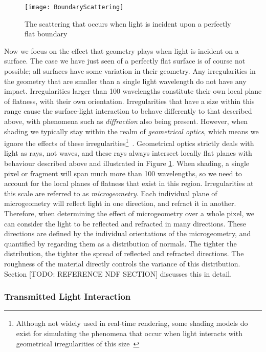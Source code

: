 \begin{figure}[h]
	\centering
	\texttt{[image: BoundaryScattering]}
	\caption{The scattering that occurs when light is incident upon a perfectly flat boundary}
	\label{fig:BoundaryScattering}
\end{figure}

Now we focus on the effect that geometry plays when light is incident on a surface. The case we have just seen of a perfectly flat surface is of course not possible; all surfaces have some variation in their geometry. Any irregularities in the geometry that are smaller than a single light wavelength do not have any impact. Irregularities larger than 100 wavelengths constitute their own local plane of flatness, with their own orientation. Irregularities that have a size within this range cause the surface-light interaction to behave differently to that described above, with phenomena such as \textit{diffraction} also being present. However, when shading we typically stay within the realm of \textit{geometrical optics}, which means we ignore the effects of these irregularities\footnote{Although not widely used in real-time rendering, some shading models do exist for simulating the phenomena that occur when light interacts with geometrical irregularities of this size~\cite{ReflectionAndDiffractionModel}}~\cite{DiffuseSpecularAtSurfaces}. Geometrical optics strictly deals with light as rays, not waves, and these rays always intersect locally flat planes with behaviour described above and illustrated in Figure \ref{fig:BoundaryScattering}. When shading, a single pixel or fragment will span much more than 100 wavelengths, so we need to account for the local planes of flatness that exist in this region. Irregularities at this scale are referred to as \textit{microgeometry}. Each individual plane of microgeometry will reflect light in one direction, and refract it in another. Therefore, when determining the effect of microgeometry over a whole pixel, we can consider the light to be reflected and refracted in many directions. These directions are defined by the individual orientations of the microgeometry, and quantified by regarding them as a distribution of normals. The tighter the distribution, the tighter the spread of reflected and refracted directions. The roughness of the material directly controls the variance of this distribution. Section [TODO: REFERENCE NDF SECTION] discusses this in detail.

\subsubsection{Transmitted Light Interaction}


